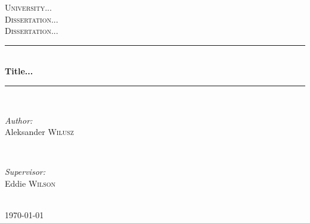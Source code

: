 \documentclass[11pt,english]{article}
\begin{document}

\begin{titlepage}

\newcommand{\HRule}{\rule{\linewidth}{0.5mm}} %

\center %

\textsc{\LARGE University...}\\[1.5cm] %
\textsc{\Large Dissertation...}\\[0.5cm] %
\textsc{\large Dissertation...}\\[0.5cm] %

\HRule \\[0.4cm]
{ \huge \bfseries Title...}\\[0.4cm] %
\HRule \\[1.5cm]

\begin{minipage}{0.4\textwidth}
\begin{flushleft} \large
\emph{Author:}\\
Aleksander \textsc{Wilusz} %
\end{flushleft}
\end{minipage}
~
\begin{minipage}{0.4\textwidth}
\begin{flushright} \large
\emph{Supervisor:} \\
Eddie \textsc{Wilson} %
\end{flushright}
\end{minipage}\\[4cm]



{\large \today}\\[3cm] %


\vfill %

\end{titlepage}
\end{document}
